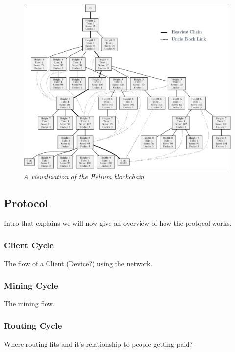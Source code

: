 \documentclass[letterpaper,11pt]{article}
\begin{document}
\begin{figure}[H]
	\begin{center}
  		\includegraphics[width=\textwidth]{chain.eps}
  		\caption{\textit{A visualization of the Helium blockchain}}
  		\label{fig:chain}
 	\end{center}
\end{figure}

\subsection{Protocol}

Intro that explains we will now give an overview of how the protocol works.

\subsubsection{Client Cycle}

The flow of a Client (Device?) using the network.

\subsubsection{Mining Cycle} \label{mining}

The mining flow.

\subsubsection{Routing Cycle}

Where routing fits and it's relationship to people getting paid?
\end{document}
